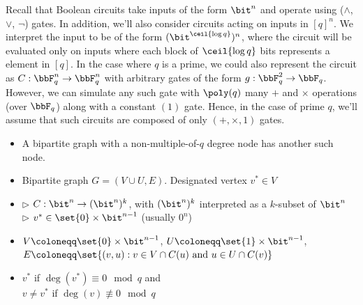 Recall that Boolean circuits take inputs of the form $\bit^n$ and operate using ($\wedge$, $\vee$, $\lnot$) gates. In addition, we'll also consider circuits acting on inputs in $[q]^n$. We interpret the input to be of the form $(\bit^{\ceil{\log q}})^n$, where the circuit will be evaluated only on inputs where each block of $\ceil{\log q}$ bits represents a element in $[q]$. In the case where $q$ is a prime, we could also represent the circuit as $C:\bbF_q^n \to \bbF_q^n$ with arbitrary gates of the form $g: \bbF_q^2 \to \bbF_q$. However, we can simulate any such gate with $\poly(q)$ many $+$ and $\times$ operations (over $\bbF_q$) along with a constant $(1)$ gate. Hence, in the case of prime $q$, we'll assume that such circuits are composed of only $(+, \times, 1)$ gates.\\[1mm]





\noindent
\begin{minipage}{\linewidth}
\begin{definition}
	\label{def:bipartite} \vspace{-5pt}
	\begin{itemize}[leftmargin=2.15cm,itemsep=4pt]
		\item[\slshape Principle:] A bipartite graph with a non-multiple-of-$q$ degree node has another such node.
		\item[\slshape Object:] Bipartite graph $G = (V \cup U, E)$. Designated vertex $v^* \in V$
		\item[\slshape Inputs:] $\triangleright$ $C:\bit^n \to (\bit^n)^k$, with $(\bit^n)^k$ interpreted as a $k$-subset of $\bit^n$\\
	$\triangleright$ $v^* \in \set{0}\times\bit^{n-1}$ (usually $0^n$)
		\item[\slshape Encoding:] $V\coloneqq\set{0}\times\bit^{n-1}$, $U\coloneqq\set{1}\times\bit^{n-1}$,\\
	$E \coloneqq \set{(v,u) : v \in V \cap C(u) \text{ and } u \in U \cap C(v)}$
		\item[\slshape Solutions:] $v^*$ if $\deg(v^*) \equiv 0 \mod{q}$ and\\
	$v \ne v^*$ if $\deg(v) \not\equiv 0 \mod{q}$
	\end{itemize}
\end{definition}
\end{minipage}\vspace{5mm}



